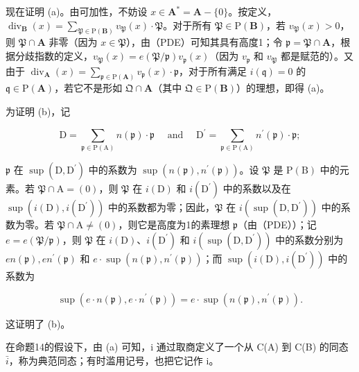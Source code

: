 现在证明 (a)。由可加性，不妨设 \(x \in \mathbf{A}^* = \mathbf{A} - \{0\}\)。按定义，\(\operatorname{div}_{\mathbf{B}}(x) = \sum_{\mathfrak{P} \in \mathrm{P}(\mathbf{B})} v_{\mathfrak{P}}(x) \cdot \mathfrak{P}\)。对于所有 \(\mathfrak{P} \in \mathrm{P}(\mathbf{B})\)，若 \(v_{\mathfrak{P}}(x) > 0\)，则 \(\mathfrak{P} \cap \mathbf{A}\) 非零（因为 \(x \in \mathfrak{P}\)），由（PDE）可知其具有高度1；令 \(\mathfrak{p} = \mathfrak{P} \cap \mathbf{A}\)，根据分歧指数的定义，\(v_{\mathfrak{P}}(x) = e(\mathfrak{P}/\mathfrak{p})v_{\mathfrak{p}}(x)\)（因为 \(v_{\mathfrak{p}}\) 和 \(v_{\mathfrak{P}}\) 都是赋范的）。又由于 \(\operatorname{div}_{\mathbf{A}}(x) = \sum_{\mathfrak{p} \in \mathrm{P}(\mathbf{A})} v_{\mathfrak{p}}(x) \cdot \mathfrak{p}\)，对于所有满足 \(i(\mathfrak{q}) = 0\) 的 \(\mathfrak{q} \in \mathrm{P}(\mathbf{A})\)，若它不是形如 \(\mathfrak{Q} \cap \mathbf{A}\)（其中 \(\mathfrak{Q} \in \mathrm{P}(\mathbf{B})\)）的理想，即得 (a)。

为证明 (b)，记

\[
\mathrm{D} = \sum_ {\mathfrak {p} \in \mathrm{P} (\mathrm{A})} n (\mathfrak {p}) \cdot \mathfrak {p} \quad \text { and } \quad \mathrm{D} ^ {\prime} = \sum_ {\mathfrak {p} \in \mathrm{P} (\mathrm{A})} n ^ {\prime} (\mathfrak {p}) \cdot \mathfrak {p};
\]

\(\mathfrak{p}\) 在 \(\sup (\mathrm{D},\mathrm{D}^{\prime})\) 中的系数为 \(\sup (n(\mathfrak{p}),n^{\prime}(\mathfrak{p}))\)。设 \(\mathfrak{P}\) 是 \(\mathrm{P(B)}\) 中的元素。若 \(\mathfrak{P}\cap \mathrm{A} = (0)\)，则 \(\mathfrak{P}\) 在 \(i(\mathrm{D})\) 和 \(i(\mathrm{D}^{\prime})\) 中的系数以及在 \(\sup (i(\mathrm{D}),i(\mathrm{D}^{\prime}))\) 中的系数都为零；因此，\(\mathfrak{P}\) 在 \(i(\sup (\mathrm{D},\mathrm{D}^{\prime}))\) 中的系数为零。若 \(\mathfrak{P}\cap \mathrm{A}\neq (0)\)，则它是高度为1的素理想 \(\mathfrak{p}\)（由（PDE））；记 \(e = e(\mathfrak{P} / \mathfrak{p})\)，则 \(\mathfrak{P}\) 在 \(i(\mathrm{D})\)、\(i(\mathrm{D}^{\prime})\) 和 \(i(\sup (\mathrm{D},\mathrm{D}^{\prime}))\) 中的系数分别为 \(en(\mathfrak{p}),en^{\prime}(\mathfrak{p})\) 和 \(e \cdot\sup (n(\mathfrak{p}),n^{\prime}(\mathfrak{p}))\)；而 \(\sup (i(\mathrm{D}),i(\mathrm{D}^{\prime}))\) 中的系数为

\[
\sup (e \cdot n (\mathfrak {p}), e \cdot n ^ {\prime} (\mathfrak {p})) = e \cdot \sup (n (\mathfrak {p}), n ^ {\prime} (\mathfrak {p})).
\]

这证明了 (b)。

在命题14的假设下，由 (a) 可知，i 通过取商定义了一个从 C(A) 到 C(B) 的同态 \(\bar{i}\)，称为典范同态；有时滥用记号，也把它记作 i。


